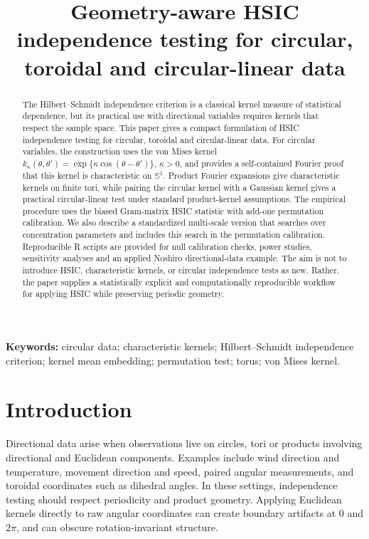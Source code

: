 \documentclass[11pt]{article}
\title{Geometry-aware HSIC independence testing for circular, toroidal and circular-linear data}
\author{}
\date{}
\begin{document}
\maketitle

\begin{abstract}
The Hilbert--Schmidt independence criterion is a classical kernel measure of statistical dependence, but its practical use with directional variables requires kernels that respect the sample space.  This paper gives a compact formulation of HSIC independence testing for circular, toroidal and circular-linear data.  For circular variables, the construction uses the von Mises kernel \(k_\kappa(\theta,\theta')=\exp\{\kappa\cos(\theta-\theta')\}\), \(\kappa>0\), and provides a self-contained Fourier proof that this kernel is characteristic on \(\mathbb S^1\).  Product Fourier expansions give characteristic kernels on finite tori, while pairing the circular kernel with a Gaussian kernel gives a practical circular-linear test under standard product-kernel assumptions.  The empirical procedure uses the biased Gram-matrix HSIC statistic with add-one permutation calibration.  We also describe a standardized multi-scale version that searches over concentration parameters and includes this search in the permutation calibration.  Reproducible R scripts are provided for null calibration checks, power studies, sensitivity analyses and an applied Noshiro directional-data example.  The aim is not to introduce HSIC, characteristic kernels, or circular independence tests as new.  Rather, the paper supplies a statistically explicit and computationally reproducible workflow for applying HSIC while preserving periodic geometry.
\end{abstract}

\noindent\textbf{Keywords:} circular data; characteristic kernels; Hilbert--Schmidt independence criterion; kernel mean embedding; permutation test; torus; von Mises kernel.

\section{Introduction}

Directional data arise when observations live on circles, tori or products involving directional and Euclidean components.  Examples include wind direction and temperature, movement direction and speed, paired angular measurements, and toroidal coordinates such as dihedral angles.  In these settings, independence testing should respect periodicity and product geometry.  Applying Euclidean kernels directly to raw angular coordinates can create boundary artifacts at \(0\) and \(2\pi\), and can obscure rotation-invariant structure.
\end{document}
